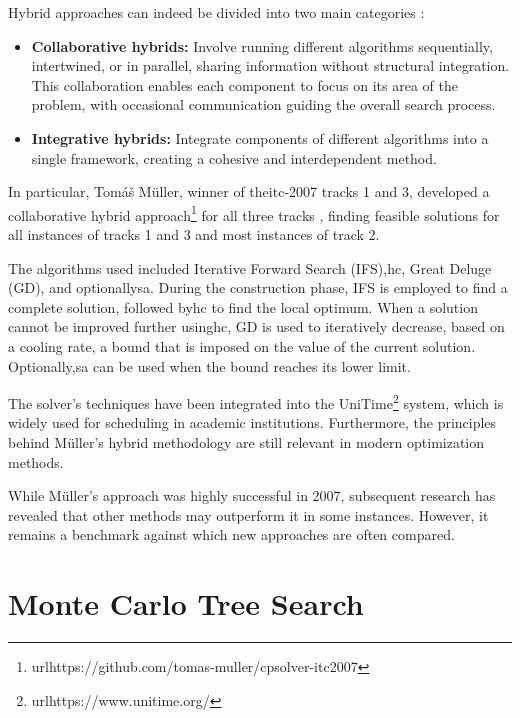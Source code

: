 Hybrid approaches can indeed be divided into two main categories \cite{abdipoor_meta-heuristic_2023}:

\begin{itemize}
\item \textbf{Collaborative hybrids:} Involve running different algorithms sequentially, intertwined, or in parallel, sharing information without structural integration. This collaboration enables each component to focus on its area of the problem, with occasional communication guiding the overall search process.

\item \textbf{Integrative hybrids:} Integrate components of different algorithms into a single framework, creating a cohesive and interdependent method.

\end{itemize}


In particular, Tomáš Müller, winner of the\ac{itc-2007} tracks 1 and 3, developed a collaborative hybrid approach\footnote{url{https://github.com/tomas-muller/cpsolver-itc2007}} for all three tracks \cite{muller_itc2007}, finding feasible solutions for all instances of tracks 1 and 3 and most instances of track 2. 

The algorithms used included Iterative Forward Search (IFS),\ac{hc}, Great Deluge (GD), and optionally\ac{sa}. During the construction phase, IFS is employed to find a complete solution, followed by\ac{hc} to find the local optimum. When a solution cannot be improved further using\ac{hc}, GD is used to iteratively decrease, based on a cooling rate, a bound that is imposed on the value of the current solution. Optionally,\ac{sa} can be used when the bound reaches its lower limit.

The solver's techniques have been integrated into the UniTime\footnote{url{https://www.unitime.org/}} system, which is widely used for scheduling in academic institutions. Furthermore, the principles behind Müller's hybrid methodology are still relevant in modern optimization methods.

While Müller's approach was highly successful in 2007, subsequent research has revealed that other methods may outperform it in some instances. However, it remains a benchmark against which new approaches are often compared.

\section{Monte Carlo Tree Search}

